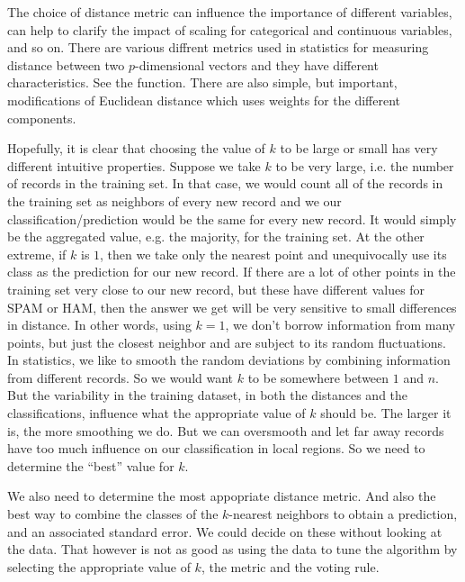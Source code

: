The choice of distance metric can influence the importance of
different variables, can help to clarify the impact of scaling for
categorical and continuous variables, and so on.  There are various
diffrent metrics used in statistics for measuring distance between two
$p$-dimensional vectors and they have different characteristics. See
the  function.  There are also simple, but important,
modifications of Euclidean distance which uses weights for the
different components.

Hopefully, it is clear that choosing the value of $k$ to be large or
small has very different intuitive properties.  Suppose we take $k$ to
be very large, i.e. the number of records in the training set.  In
that case, we would count all of the records in the training set as
neighbors of every new record and we our classification/prediction
would be the same for every new record.  It would simply be the
aggregated value, e.g. the majority, for the training set.  At the
other extreme, if $k$ is $1$, then we take only the nearest point and
unequivocally use its class as the prediction for our new record.  If
there are a lot of other points in the training set very close to our
new record, but these have different values for SPAM or HAM, then the
answer we get will be very sensitive to small differences in distance.
In other words, using $k = 1$, we don't borrow information from many
points, but just the closest neighbor and are subject to its random
fluctuations. In statistics, we like to smooth the random deviations
by combining information from different records.  So we would want $k$
to be somewhere between $1$ and $n$. But the variability in the
training dataset, in both the distances and the classifications,
influence what the appropriate value of $k$ should be.  The larger it
is, the more smoothing we do. But we can oversmooth and let far away
records have too much influence on our classification in local
regions.  So we need to determine the ``best'' value for $k$.

We also need to determine the most appopriate distance metric. And
also the best way to combine the classes of the $k$-nearest neighbors
to obtain a prediction, and an associated standard error.
We could decide on these without looking at the data.
That however is not as good as using the data to 
tune the algorithm by selecting the appropriate
value of $k$, the metric and the voting rule. 

